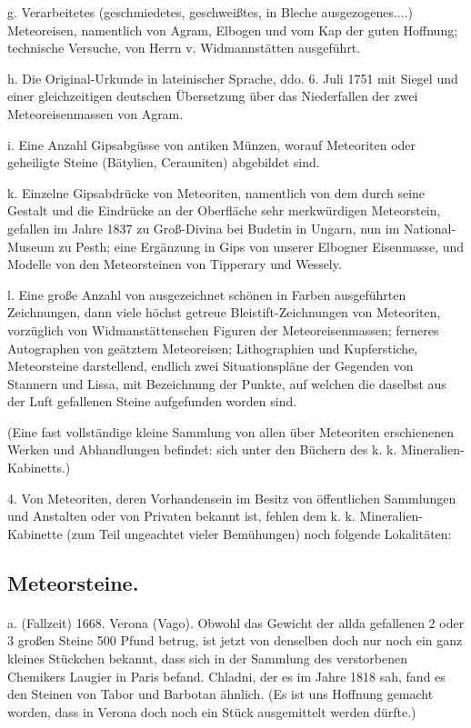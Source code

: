 \documentclass[a4paper, 11pt, oneside, polutonikogreek, german]{article}
\begin{document}
g. Verarbeitetes (geschmiedetes, geschweißtes, in Bleche ausgezogenes....) Meteoreisen, namentlich von Agram, Elbogen und vom Kap der guten Hoffnung; technische Versuche, von Herrn v. Widmannstätten ausgeführt.

h. Die Original-Urkunde in lateinischer Sprache, ddo. 6. Juli 1751 mit Siegel und einer gleichzeitigen deutschen Übersetzung über das Niederfallen der zwei Meteoreisenmassen von Agram.

i. Eine Anzahl Gipsabgüsse von antiken Münzen, worauf Meteoriten oder geheiligte Steine (Bätylien, Cerauniten) abgebildet sind.

k. Einzelne Gipsabdrücke von Meteoriten, namentlich von dem durch seine Gestalt und die Eindrücke an der Oberfläche sehr merkwürdigen Meteorstein, gefallen im Jahre 1837 zu Groß-Divina bei Budetin in Ungarn, nun im National-Museum zu Pesth; eine Ergänzung in Gips von unserer Elbogner Eisenmasse, und Modelle von den Meteorsteinen von Tipperary und Wessely.

l. Eine große Anzahl von ausgezeichnet schönen in Farben ausgeführten Zeichnungen, dann viele höchst getreue Bleistift-Zeichnungen von Meteoriten, vorzüglich von Widmanstättenschen Figuren der Meteoreisenmassen; ferneres Autographen von geätztem Meteoreisen; Lithographien und Kupferstiche, Meteorsteine darstellend, endlich zwei Situationspläne der Gegenden von Stannern und Lissa, mit Bezeichnung der Punkte, auf welchen die daselbst aus der Luft gefallenen Steine aufgefunden worden sind.

(Eine fast vollständige kleine Sammlung von allen über Meteoriten erschienenen Werken und Abhandlungen befindet: sich unter den Büchern des k. k. Mineralien-Kabinetts.)

4. Von Meteoriten, deren Vorhandensein im Besitz von öffentlichen Sammlungen und Anstalten oder von Privaten bekannt ist, fehlen dem k. k. Mineralien-Kabinette (zum Teil ungeachtet vieler Bemühungen) noch folgende Lokalitäten:
\subsection{Meteorsteine.}
\paragraph{}
a. (Fallzeit) 1668. Verona (Vago). Obwohl das Gewicht der allda gefallenen 2 oder 3 großen Steine 500 Pfund betrug, ist jetzt von denselben doch nur noch ein ganz kleines Stückchen bekannt, dass sich in der Sammlung des verstorbenen Chemikers Laugier in Paris befand. Chladni, der es im Jahre 1818 sah, fand es den Steinen von Tabor und Barbotan ähnlich. (Es ist uns Hoffnung gemacht worden, dass in Verona doch noch ein Stück ausgemittelt werden dürfte.)
\end{document}
